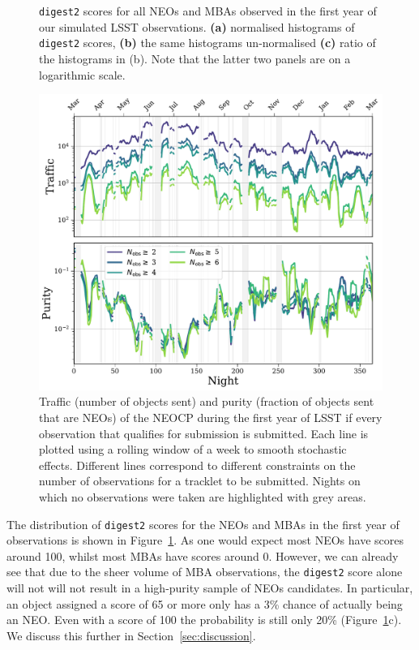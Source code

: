 \documentclass[twocolumn]{aastex631}
\newcommand{\dig}{\texttt{digest2}}
\begin{document}
\begin{figure}[b]
    \caption{\dig{} scores for all NEOs and MBAs observed in the first year of our simulated LSST observations. \textbf{(a)} normalised histograms of \dig{} scores, \textbf{(b)} the same histograms un-normalised \textbf{(c)} ratio of the histograms in (b). Note that the latter two panels are on a logarithmic scale.}
    \label{fig:digest2_example}
\end{figure}
\begin{figure}[htb]
    \centering
    \includegraphics[width=\textwidth]{traffic_purity.pdf}
    \caption{Traffic (number of objects sent) and purity (fraction of objects sent that are NEOs) of the NEOCP during the first year of LSST if every observation that qualifies for submission is submitted. Each line is plotted using a rolling window of a week to smooth stochastic effects. Different lines correspond to different constraints on the number of observations for a tracklet to be submitted. Nights on which no observations were taken are highlighted with grey areas.}
    \label{fig:neocp_traffic}
\end{figure}

The distribution of \dig{} scores for the NEOs and MBAs in the first year of observations is shown in Figure~\ref{fig:digest2_example}. As one would expect most NEOs have scores around 100, whilst most MBAs have scores around 0. However, we can already see that due to the sheer volume of MBA observations, the \dig{} score alone will not will not result in a high-purity sample of NEOs candidates. In particular, an object assigned a score of 65 or more only has a 3\% chance of actually being an NEO. Even with a score of 100 the probability is still only 20\% (Figure~\ref{fig:digest2_example}c). We discuss this further in Section~\ref{sec:discussion}.
\end{document}
